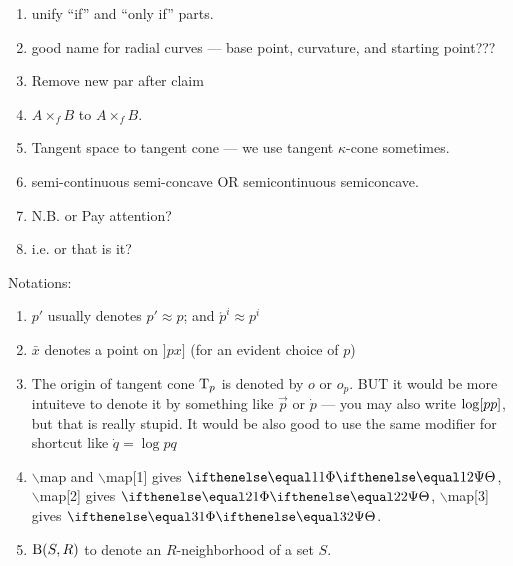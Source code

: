 \begin{enumerate}
\item unify ``if'' and ``only if'' parts.

\item good name for radial curves --- base point, curvature, and starting point???

\item Remove new par after claim

\item $A\times_f B$ to $A\mathrel{{\times}_f} B$.

\item Tangent space to tangent cone --- we use tangent $\kappa$-cone sometimes.

\item semi-continuous semi-concave OR semicontinuous semiconcave.

\item N.B. or Pay attention?

\item i.e. or that is it?

\end{enumerate}

Notations:
\begin{enumerate}
\item $p'$ usually denotes $p'\approx p$; 
and $\acute{p}^i\approx p^i$
\item $\bar x$ denotes a point on  $]p x]$ (for an evident choice of $p$)
\item The origin of tangent cone $\text{\rm T}_p$ is denoted by $o$ or $o_p$. BUT it would be more intuiteve to denote it by something like $\vec p$ or $\dot p$ --- you may also write $\mathrm{log}[{p}{p}]$, but that is really stupid.
It would be also good  to use the same modifier for shortcut like $\dot q=\log p q$
\item $\backslash$map and $\backslash$map[1] gives $\map$, $\backslash$map[2] gives $\map[2]$, $\backslash$map[3] gives $\map[3]$.
\item $\mathrm{B}{}(S,R)$  to denote an $R$-neighborhood of a set $S$.
\end{enumerate}

